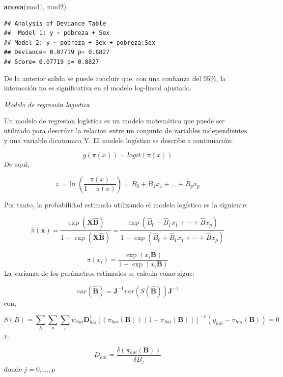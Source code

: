 \documentclass[
  spanish,
  12pt,
]{book}
\newenvironment{Shaded}{\begin{snugshade}}{\end{snugshade}}
\newcommand{\FunctionTok}[1]{\textcolor[rgb]{0.13,0.29,0.53}{\textbf{#1}}}
\newcommand{\NormalTok}[1]{#1}
\begin{document}
\begin{Shaded}
\begin{Highlighting}[]
\FunctionTok{anova}\NormalTok{(mod1, mod2)}
\end{Highlighting}
\end{Shaded}

\begin{verbatim}
## Analysis of Deviance Table
##  Model 1: y ~ pobreza + Sex
## Model 2: y ~ pobreza + Sex + pobreza:Sex 
## Deviance= 0.07719 p= 0.8827 
## Score= 0.07719 p= 0.8827
\end{verbatim}

De la anterior salida se puede concluir que, con una confianza del 95\%, la interacción no es significativa en el modelo log-lineal ajustado.

\emph{Modelo de regresión logistica}

Un modelo de regresion logística es un modelo matemático que puede ser utilizado para describir la relacion entre un conjunto de variables independientes y una variable dicotomica Y. El modelo logístico se describe a continuación:

\[
    g(\pi(x))=logit(\pi(x)) 
\]
De aquí,

\[
z = \ln\left(\frac{\pi(x)}{1-\pi(x)}\right) = B_0 + B_1x_1+\dots+B_px_p
\]

Por tanto, la probabilidad estimada utilizando el modelo logístico es la siguiente:

\[
    \hat{\pi}\left(\boldsymbol{x}\right)=\frac{\exp\left(\boldsymbol{X\hat{B}}\right)}{1-\exp\left(\boldsymbol{X\hat{B}}\right)}=\frac{\exp\left(\hat{B}_{0}+\hat{B}_{1}x_{1}+\cdots+\hat{B}x_{p}\right)}{1-\exp\left(\hat{B}_{0}+\hat{B}_{1}x_{1}+\cdots+\hat{B}x_{p}\right)}
\]

\[
    \pi\left(x_{i}\right)=\frac{\exp\left(x_{i}\boldsymbol{B}\right)}{1-\exp\left(x_{i}\boldsymbol{B}\right)}
\]
La varianza de los parámetros estimados se calcula como sigue:

\[
    var\left(\boldsymbol{\hat{B}}\right)=\boldsymbol{J}^{-1}var\left(S\left(\hat{\boldsymbol{B}}\right)\right)\boldsymbol{J}^{-1}
\]
con,

\[
    S\left(B\right)=\sum_{h}\sum_{a}\sum_{i}w_{hai}\boldsymbol{D}_{hai}^{t}\left[\left(\pi_{hai}\left(\boldsymbol{B}\right)\right)\left(1-\pi_{hai}\left(\boldsymbol{B}\right)\right)\right]^{-1}\left(y_{hai}-\pi_{hai}\left(\boldsymbol{B}\right)\right)=0
\]
y,

\[
    D_{hai} = \frac{\delta\left(\pi_{hai}\left(\boldsymbol{B}\right)\right)}{\delta B_{j}}
\]
donde \(j=0,\dots,p\)
\end{document}
